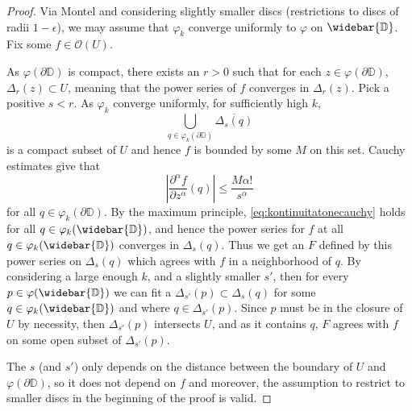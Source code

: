 \documentclass[12pt,openany]{book}
\newcommand{\abs}[1]{\left\lvert {#1} \right\rvert}
\newcommand{\C}{{\mathbb{C}}}
\newcommand{\D}{{\mathbb{D}}}
\newcommand{\sO}{{\mathscr{O}}}
\theoremstyle{plain}
\theoremstyle{remark}
\theoremstyle{definition}
\theoremstyle{exercise}
\theoremstyle{example}
\begin{document}
\begin{proof}
Via Montel and considering slightly smaller discs
(restrictions to discs of radii $1-\epsilon$), we may
assume that $\varphi_k$ converge uniformly to $\varphi$ on $\widebar{\D}$.
Fix some $f \in \sO(U)$.

As $\varphi(\partial \D)$ is compact, there exists an $r > 0$ such that
for each $z \in \varphi(\partial \D)$, $\Delta_r(z) \subset U$, meaning that
the power series of $f$ converges in $\Delta_r(z)$.
Pick a positive $s < r$.
As $\varphi_k$ converge uniformly, for sufficiently high $k$,
\begin{equation*}
\bigcup_{q \in \varphi_k(\partial \D)} \overline{\Delta_s(q)}
\end{equation*}
is a compact subset of $U$ and hence $f$ is bounded by some $M$ on this set.
Cauchy estimates give that
\begin{equation} \label{eq:kontinuitatonecauchy}
\abs{\frac{\partial^\alpha f}{\partial z^\alpha}(q)}
\leq
\frac{M \alpha!}{s^\alpha}
\end{equation}
for all $q \in \varphi_k(\partial \D)$.  By the maximum principle,
\eqref{eq:kontinuitatonecauchy} holds for all $q \in \varphi_k(\widebar{\D})$,
and hence the power series for $f$ at all $q \in \varphi_k(\widebar{\D})$
converges in $\Delta_s(q)$.
Thus we get an $F$ defined by this power series on $\Delta_s(q)$ which
agrees with $f$ in a neighborhood of $q$.
By considering a large enough $k$, and a slightly smaller $s'$,
then for every $p \in \varphi(\widebar{\D})$ we can fit a $\Delta_{s'}(p)
\subset \Delta_s(q)$ for some $q \in \varphi_k(\widebar{\D})$ and where
$q \in \Delta_{s'}(p)$.
Since $p$ must be in the closure of $U$ by necessity, then $\Delta_{s'}(p)$
intersects $U$, and as it contains $q$, $F$ agrees with $f$ on some open
subset of $\Delta_{s'}(p)$.

The $s$ (and $s'$) only depends on the distance between the boundary of $U$
and $\varphi(\partial \D)$, so it does not depend on $f$ and moreover,
the assumption to restrict to smaller discs in the beginning of the proof
is valid.
\end{proof}
\end{document}
